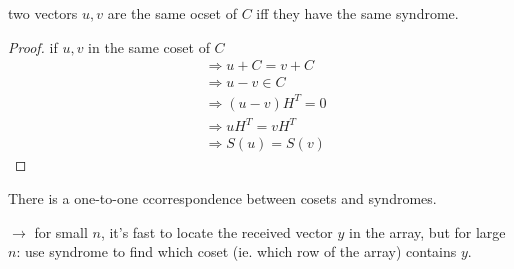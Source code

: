 \documentclass{article}
\theoremstyle{definition}
\newenvironment{lemma}[1]
{\renewcommand\theinnerlemma{#1}\innerlemma}
{\endinnerlemma}
\newenvironment{cor}[1]
{\renewcommand\theinnercor{#1}\innercor}
{\endinnercor}
\begin{document}
\begin{lemma}{7.8}
  two vectors $u,v$ are the same ocset of $C$ iff they have the same syndrome.
\end{lemma}
\begin{proof}
  if $u,v$ in the same coset of $C$
  \begin{align*}
    &\Longrightarrow u+C = v+C\\
    &\Longrightarrow u-v \in C\\
    &\Longrightarrow (u-v)H^T =0\\
    &\Longrightarrow uH^T =v H^T\\
    &\Longrightarrow S(u) = S(v)
  \end{align*}
\end{proof}

\begin{cor}{7.9}
  There is a one-to-one ccorrespondence between cosets and syndromes.

  $\longrightarrow$ for small $n$, it's fast to locate the received vector $y$ in the array, but for large $n$: use syndrome to find which coset (ie. which row of the array) contains $y$.
\end{cor}
\end{document}
